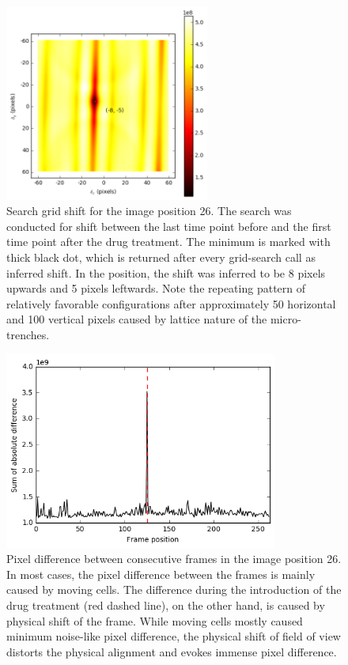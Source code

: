 \documentclass[pdftex,12pt,a4paper]{report}
\begin{document}
\begin{figure}[H]
\centering
\includegraphics[width=0.6\textwidth]{images/search_grid}
\caption[Example of search grid from the shift inference algorithm]{Search grid shift for the image position 26. The search was conducted for shift between the last time point before and the first time point after the drug treatment. The minimum is marked with thick black dot, which is returned after every grid-search call as inferred shift. In the position, the shift was inferred to be 8 pixels upwards and 5 pixels leftwards. Note the repeating pattern of relatively favorable configurations after approximately 50 horizontal and 100 vertical pixels caused by lattice nature of the micro-trenches.}
\label{fig:searchgrid}
\end{figure}

\begin{figure}[H]
\centering
\includegraphics[width=0.8\textwidth]{images/pixdiff}
\caption[Slice-wise sum of pixel difference in a stack]{Pixel difference between consecutive frames in the image position 26. In most cases, the pixel difference between the frames is mainly caused by moving cells. The difference during the introduction of the drug treatment (red dashed line), on the other hand, is caused by physical shift of the frame. While moving cells mostly caused minimum noise-like pixel difference, the physical shift of field of view distorts the physical alignment and evokes immense pixel difference.}
\label{fig:pixdiff}
\end{figure}
\end{document}
